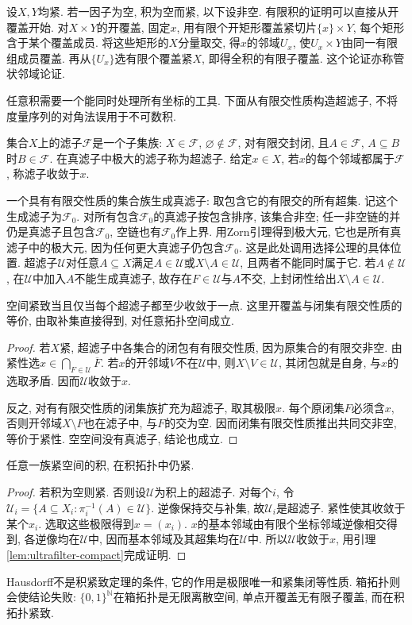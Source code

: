 设$X,Y$均紧. 若一因子为空, 积为空而紧, 以下设非空. 有限积的证明可以直接从开覆盖开始. 对$X\times Y$的开覆盖, 固定$x$, 用有限个开矩形覆盖紧切片$\{x\}\times Y$, 每个矩形含于某个覆盖成员. 将这些矩形的$X$分量取交, 得$x$的邻域$U_x$, 使$U_x\times Y$由同一有限组成员覆盖. 再从$\{U_x\}$选有限个覆盖紧$X$, 即得全积的有限子覆盖. 这个论证亦称管状邻域论证.

任意积需要一个能同时处理所有坐标的工具. 下面从有限交性质构造超滤子, 不将度量序列的对角法误用于不可数积.
\begin{definition}
集合$X$上的滤子$\mathcal F$是一个子集族: $X\in\mathcal F$, $\varnothing\notin\mathcal F$, 对有限交封闭, 且$A\in\mathcal F$, $A\subseteq B$时$B\in\mathcal F$. 在真滤子中极大的滤子称为超滤子. 给定$x\in X$, 若$x$的每个邻域都属于$\mathcal F$, 称滤子收敛于$x$.
\end{definition}
一个具有有限交性质的集合族生成真滤子: 取包含它的有限交的所有超集. 记这个生成滤子为$\mathcal F_0$. 对所有包含$\mathcal F_0$的真滤子按包含排序, 该集合非空; 任一非空链的并仍是真滤子且包含$\mathcal F_0$, 空链也有$\mathcal F_0$作上界. 用Zorn引理得到极大元, 它也是所有真滤子中的极大元, 因为任何更大真滤子仍包含$\mathcal F_0$. 这是此处调用选择公理的具体位置. 超滤子$\mathcal U$对任意$A\subseteq X$满足$A\in\mathcal U$或$X\setminus A\in\mathcal U$, 且两者不能同时属于它. 若$A\notin\mathcal U$, 在$\mathcal U$中加入$A$不能生成真滤子, 故存在$F\in\mathcal U$与$A$不交, 上封闭性给出$X\setminus A\in\mathcal U$.

\begin{lemma}\label{lem:ultrafilter-compact}
空间紧致当且仅当每个超滤子都至少收敛于一点. 这里开覆盖与闭集有限交性质的等价, 由取补集直接得到, 对任意拓扑空间成立.
\end{lemma}
\begin{proof}
若$X$紧, 超滤子中各集合的闭包有有限交性质, 因为原集合的有限交非空. 由紧性选$x\in\bigcap_{F\in\mathcal U}\overline F$. 若$x$的开邻域$V$不在$\mathcal U$中, 则$X\setminus V\in\mathcal U$, 其闭包就是自身, 与$x$的选取矛盾. 因而$\mathcal U$收敛于$x$.

反之, 对有有限交性质的闭集族扩充为超滤子, 取其极限$x$. 每个原闭集$F$必须含$x$, 否则开邻域$X\setminus F$也在滤子中, 与$F$的交为空. 因而闭集有限交性质推出共同交非空, 等价于紧性. 空空间没有真滤子, 结论也成立.
\end{proof}

\begin{theorem}[Tychonoff定理]\label{thm:tychonoff}
任意一族紧空间的积, 在积拓扑中仍紧.
\end{theorem}
\begin{proof}
若积为空则紧. 否则设$\mathcal U$为积上的超滤子. 对每个$i$, 令$\mathcal U_i=\{A\subseteq X_i:\pi_i^{-1}(A)\in\mathcal U\}$. 逆像保持交与补集, 故$\mathcal U_i$是超滤子. 紧性使其收敛于某个$x_i$. 选取这些极限得到$x=(x_i)$. $x$的基本邻域由有限个坐标邻域逆像相交得到, 各逆像均在$\mathcal U$中, 因而基本邻域及其超集均在$\mathcal U$中. 所以$\mathcal U$收敛于$x$, 用引理\ref{lem:ultrafilter-compact}完成证明.
\end{proof}
Hausdorff不是积紧致定理的条件, 它的作用是极限唯一和紧集闭等性质. 箱拓扑则会使结论失败: $\{0,1\}^{\mathbb N}$在箱拓扑是无限离散空间, 单点开覆盖无有限子覆盖, 而在积拓扑紧致.

